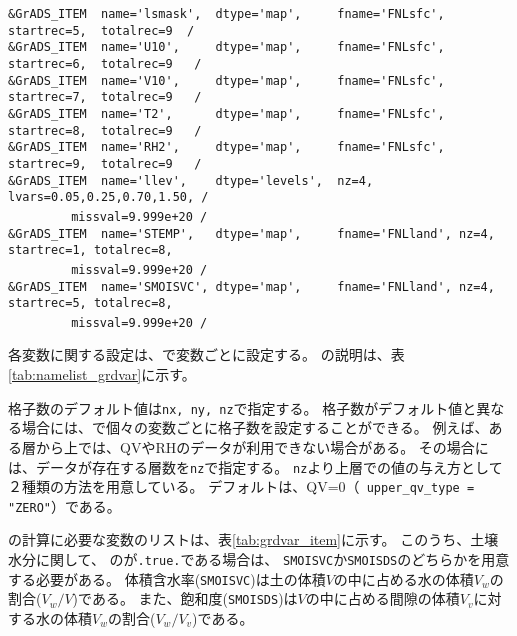 {\verb|&GrADS_ITEM  name='lsmask',  dtype='map',     fname='FNLsfc', startrec=5,  totalrec=9  /  |  \\
\verb|&GrADS_ITEM  name='U10',     dtype='map',     fname='FNLsfc', startrec=6,  totalrec=9   / |  \\
\verb|&GrADS_ITEM  name='V10',     dtype='map',     fname='FNLsfc', startrec=7,  totalrec=9   / |  \\
\verb|&GrADS_ITEM  name='T2',      dtype='map',     fname='FNLsfc', startrec=8,  totalrec=9   / |  \\
\verb|&GrADS_ITEM  name='RH2',     dtype='map',     fname='FNLsfc', startrec=9,  totalrec=9   / |  \\
\verb|&GrADS_ITEM  name='llev',    dtype='levels',  nz=4, lvars=0.05,0.25,0.70,1.50, /        |  \\
~~~~~~~~\verb| missval=9.999e+20 /|  \\
\verb|&GrADS_ITEM  name='STEMP',   dtype='map',     fname='FNLland', nz=4, startrec=1, totalrec=8,|\\
~~~~~~~~\verb| missval=9.999e+20 /|  \\
\verb|&GrADS_ITEM  name='SMOISVC', dtype='map',     fname='FNLland', nz=4, startrec=5, totalrec=8,|\\
~~~~~~~~\verb| missval=9.999e+20 /|  \\
}


各変数に関する設定は、で変数ごとに設定する。
の説明は、表\ref{tab:namelist_grdvar}に示す。

格子数のデフォルト値は\verb|nx, ny, nz|で指定する。
格子数がデフォルト値と異なる場合には、で個々の変数ごとに格子数を設定することができる。
例えば、ある層から上では、QVやRHのデータが利用できない場合がある。
その場合には、データが存在する層数を\verb|nz|で指定する。
\verb|nz|より上層での値の与え方として２種類の方法を用意している。
デフォルトは、QV=0（\verb| upper_qv_type = "ZERO"|）である。\\

\scalerm の計算に必要な変数のリストは、表\ref{tab:grdvar_item}に示す。
このうち、土壌水分に関して、
のが\verb|.true.|である場合は、
\verb|SMOISVC|か\verb|SMOISDS|のどちらかを用意する必要がある。
体積含水率(\verb|SMOISVC|)は土の体積$V$の中に占める水の体積$V_w$の割合($V_w / V$)である。
また、飽和度(\verb|SMOISDS|)は$V$の中に占める間隙の体積$V_v$に対する水の体積$V_w$の割合($V_w / V_v$)である。


